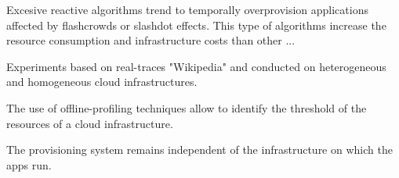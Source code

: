 

Excesive reactive algorithms trend to temporally overprovision applications affected by flashcrowds or slashdot effects. This type of algorithms increase the resource consumption and infrastructure costs than other ...

Experiments based on real-traces "Wikipedia" and conducted on heterogeneous and homogeneous cloud infrastructures. 

The use of offline-profiling techniques allow to identify the threshold of the resources of a cloud infrastructure. 

The provisioning system remains independent of the infrastructure on which the apps run.

